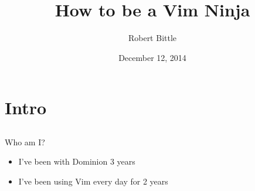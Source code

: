 \documentclass{beamer}
\title[How to be a Vim Ninja]{How to be a Vim Ninja}
\author{Robert Bittle}
\date{December 12, 2014}
\begin{document}
    \begin{frame}
    \titlepage
    \end{frame}


    \section{Intro}
    \subsection{}
    \begin{frame}{Who am I?}
        \begin{itemize}
            \item <alert@+> I've been with Dominion 3 years
            \item <alert@+> I've been using Vim every day for 2 years
        \end{itemize}
    \end{frame}
\end{document}
